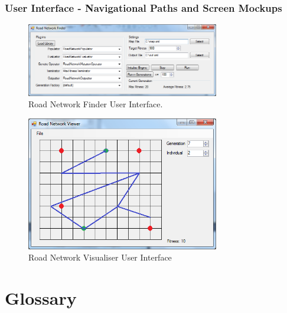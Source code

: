 \subsubsection{User Interface - Navigational Paths and Screen Mockups}
\begin{figure}[ht!]
 \caption{Road Network Finder User Interface.}
 \centering
 \includegraphics[width=0.75\textwidth]{../Finder.png}
\end{figure}

\begin{figure}[ht!]
 \caption{Road Network Visualiser User Interface}
 \centering
 \includegraphics[width=0.75\textwidth]{../Visualiser.png}
\end{figure}

\clearpage

\section{Glossary}


